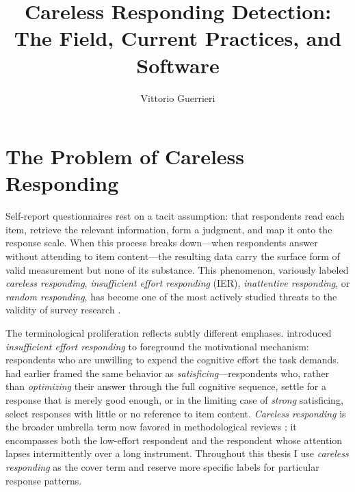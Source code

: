 \documentclass[doc,11pt,donotrepeattitle]{apa7}
\title{Careless Responding Detection: The Field, Current Practices, and Software}
\author{Vittorio Guerrieri}
\affiliation{Chapter~1 of the thesis}
\begin{document}
\maketitle

\section{The Problem of Careless Responding}

Self-report questionnaires rest on a tacit assumption: that respondents read
each item, retrieve the relevant information, form a judgment, and map it onto
the response scale. When this process breaks down---when respondents answer
without attending to item content---the resulting data carry the surface form
of valid measurement but none of its substance. This phenomenon, variously
labeled \emph{careless responding}, \emph{insufficient effort responding}
(IER), \emph{inattentive responding}, or \emph{random responding}, has become
one of the most actively studied threats to the validity of survey research
\parencite{meade2012identifying, curran2016methods, ward2023dealing}.

The terminological proliferation reflects subtly different emphases.
\textcite{huang2012detecting} introduced \emph{insufficient effort responding}
to foreground the motivational mechanism: respondents who are unwilling to
expend the cognitive effort the task demands. \textcite{krosnick1991response}
had earlier framed the same behavior as \emph{satisficing}---respondents who,
rather than \emph{optimizing} their answer through the full cognitive sequence,
settle for a response that is merely good enough, or in the limiting case of
\emph{strong} satisficing, select responses with little or no reference to item
content. \emph{Careless responding} is the broader umbrella term now favored in
methodological reviews \parencite{ward2023dealing}; it encompasses both the
low-effort respondent and the respondent whose attention lapses intermittently
over a long instrument. Throughout this thesis I use \emph{careless responding}
as the cover term and reserve more specific labels for particular response
patterns.
\end{document}
